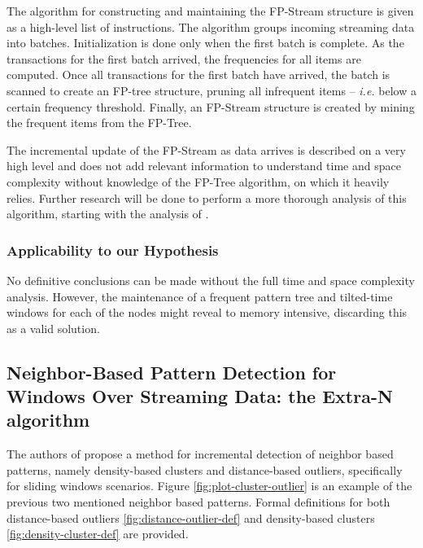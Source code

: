 The algorithm for constructing and maintaining the FP-Stream structure is given as a high-level list of instructions. The algorithm groups incoming streaming data into batches. Initialization is done only when the first batch is complete. As the transactions for the first batch arrived, the frequencies for all items are computed. Once all transactions for the first batch have arrived, the batch is scanned to create an FP-tree structure, pruning all infrequent items -- \textit{i.e.} below a certain frequency threshold. Finally, an FP-Stream structure is created by mining the frequent items from the FP-Tree.

The incremental update of the FP-Stream as data arrives is described on a very high level and does not add relevant information to understand time and space complexity without knowledge of the FP-Tree algorithm, on which it heavily relies. Further research will be done to perform a more thorough analysis of this algorithm, starting with the analysis of \cite{Han-FP-tree}.

\subsubsection{Applicability to our Hypothesis}

No definitive conclusions can be made without the full time and space complexity analysis. However, the maintenance of a frequent pattern tree and tilted-time windows for each of the nodes might reveal to memory intensive, discarding this as a valid solution.

\subsection{Neighbor-Based Pattern Detection for Windows Over Streaming Data: the Extra-N algorithm}

The authors of \cite{Yang-Neighbor-Based-Pattern-Detection} propose a method for incremental detection of neighbor based patterns, namely density-based clusters and distance-based outliers, specifically for sliding windows scenarios. Figure \ref{fig:plot-cluster-outlier} is an example of the previous two mentioned neighbor based patterns. Formal definitions for both distance-based outliers \ref{fig:distance-outlier-def} and density-based clusters \ref{fig:density-cluster-def} are provided.

